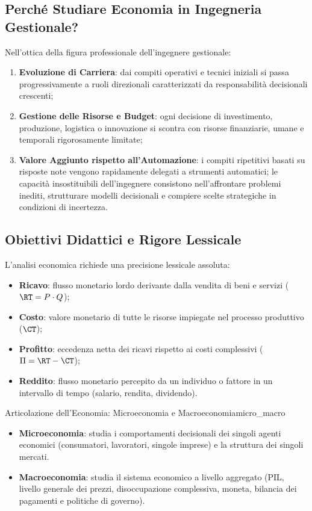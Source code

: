 \subsection{Perché Studiare Economia in Ingegneria Gestionale?}
Nell'ottica della figura professionale dell'ingegnere gestionale:
\begin{enumerate}
    \item \textbf{Evoluzione di Carriera}: dai compiti operativi e tecnici iniziali si passa progressivamente a ruoli direzionali caratterizzati da responsabilità decisionali crescenti;
    \item \textbf{Gestione delle Risorse e Budget}: ogni decisione di investimento, produzione, logistica o innovazione si scontra con risorse finanziarie, umane e temporali rigorosamente limitate;
    \item \textbf{Valore Aggiunto rispetto all'Automazione}: i compiti ripetitivi basati su risposte note vengono rapidamente delegati a strumenti automatici; le capacità insostituibili dell'ingegnere consistono nell'affrontare problemi inediti, strutturare modelli decisionali e compiere scelte strategiche in condizioni di incertezza.
\end{enumerate}

\subsection{Obiettivi Didattici e Rigore Lessicale}
L'analisi economica richiede una precisione lessicale assoluta:
\begin{itemize}
    \item \textbf{Ricavo}: flusso monetario lordo derivante dalla vendita di beni e servizi ($\RT = P \cdot Q$);
    \item \textbf{Costo}: valore monetario di tutte le risorse impiegate nel processo produttivo ($\CT$);
    \item \textbf{Profitto}: eccedenza netta dei ricavi rispetto ai costi complessivi ($\Pi = \RT - \CT$);
    \item \textbf{Reddito}: flusso monetario percepito da un individuo o fattore in un intervallo di tempo (salario, rendita, dividendo).
\end{itemize}

\begin{definizione}{Articolazione dell'Economia: Microeconomia e Macroeconomia}{micro_macro}
\begin{itemize}
    \item \textbf{Microeconomia}: studia i comportamenti decisionali dei singoli agenti economici (consumatori, lavoratori, singole imprese) e la struttura dei singoli mercati.
    \item \textbf{Macroeconomia}: studia il sistema economico a livello aggregato (PIL, livello generale dei prezzi, disoccupazione complessiva, moneta, bilancia dei pagamenti e politiche di governo).
\end{itemize}
\end{definizione}

